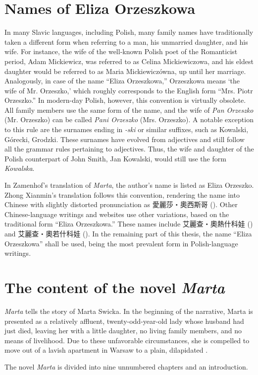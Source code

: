 \section{Names of Eliza Orzeszkowa}
In many Slavic languages, including Polish, many family names have traditionally taken a different form when referring to a man, his unmarried daughter, and his wife.
For instance, the wife of the well-known Polish poet of the Romanticist period, Adam Mickiewicz, was referred to as Celina Mickiewiczowa, and his eldest daughter would be referred to as Maria Mickiewiczówna, up until her marriage.
Analogously, in case of the name ``Eliza Orzeszkowa,'' Orzeszkowa means `the wife of Mr. Orzeszko,' which roughly corresponds to the English form ``Mrs. Piotr Orzeszko.''
In modern-day Polish, however, this convention is virtually obsolete.
All family members use the same form of the name, and the wife of \textit{Pan Orzeszko} (Mr. Orzeszko) can be called \textit{Pani Orzeszko} (Mrs. Orzeszko).
A notable exception to this rule are the surnames ending in \textit{-ski} or similar suffixes, such as Kowalski, Górecki, Grodzki.
These surnames have evolved from adjectives and still follow all the grammar rules pertaining to adjectives.
Thus, the wife and daughter of the Polish counterpart of John Smith, Jan Kowalski, would still use the form \textit{Kowalska}. 

In Zamenhof's translation of \textit{Marta}, the author's name is listed as Eliza Orzeszko.
Zhong Xianmin's translation follows this convention, rendering the name into Chinese with slightly distorted pronunciation as 愛麗莎・奧西斯哥 ().
Other Chinese-language writings and websites use other variations, based on the traditional form ``Eliza Orzeszkowa.''
These names include 艾麗查・奧熱什科娃 () and 艾麗查・奧若什科娃 (). In the remaining part of this thesis, the name ``Eliza Orzeszkowa'' shall be used, being the most prevalent form in Polish-language writings.
\section{The content of the novel \textit{Marta}}
\textit{Marta} tells the story of Marta Swicka.
In the beginning of the narrative, Marta is presented as a relatively affluent, twenty-odd-year-old lady whose husband had just died, leaving her with a little daughter, no living family members, and no means of livelihood.
Due to these unfavorable circumstances, she is compelled to move out of a lavish apartment in Warsaw to a plain, dilapidated .

The novel \textit{Marta} is divided into nine unnumbered chapters and an introduction. 